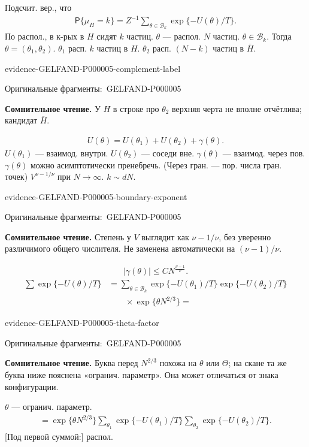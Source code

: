 \documentclass[11pt]{article}
\newcommand{\EvidenceBlock}[4]{%
 \par\smallskip\noindent\begin{minipage}{\linewidth}
 \begin{minipage}[t]{.47\linewidth}\vspace{0pt}\centering
 \csname evidence-#1-#2\endcsname\par
 {\scriptsize\SourceCropCaption\ #1}\par
 \end{minipage}\hfill
 \begin{minipage}[t]{.49\linewidth}\vspace{0pt}\raggedright
 {\small\color{orange!65!black}\textbf{#4} #3}\par
 \end{minipage}
 \end{minipage}\par\smallskip}
\newcommand{\Unclear}[3]{\EvidenceBlock{#1}{#2}{#3}{\ReadingCaption}}
\newcommand{\SourceCropCaption}{Оригинальные фрагменты:}\newcommand{\ReadingCaption}{Сомнительное чтение.}\newcommand{\IncompleteCaption}{Неразобранный фрагмент.}\newcommand{\DiagramCaption}{Рисунок и набранное описание.}
\begin{document}
Подсчит. вер., что
\begin{gather*}
 \mathsf{P}\{\mu_H=k\}=Z^{-1}
 \sum_{\theta\in\mathcal{B}_k}\exp\{-U(\theta)/T\}.
\end{gather*}
По распол., в к-рых в $H$ сидят $k$ частиц.
$\theta$ — распол. $N$ частиц.
$\theta\in\mathcal{B}_k$.
Тогда $\theta=(\theta_1,\theta_2)$.
$\theta_1$ расп. $k$ частиц в $H$.
$\theta_2$ расп. $(N-k)$ частиц в $\overline H$.
\Unclear{GELFAND-P000005}{complement-label}{У $H$ в строке про $\theta_2$ верхняя черта не вполне отчётлива; кандидат $\overline H$.}
\begin{gather*}
 U(\theta)=U(\theta_1)+U(\theta_2)+\gamma(\theta).
\end{gather*}
$U(\theta_1)$ — взаимод. внутри.
$U(\theta_2)$ — соседи вне.
$\gamma(\theta)$ — взаимод. через пов.
$\gamma(\theta)$ можно асимптотически пренебречь.
(Через гран. — пор. числа гран. точек)
$V^{\nu-1/\nu}$ при $N\to\infty$.
$k\sim dN$.
\Unclear{GELFAND-P000005}{boundary-exponent}{Степень у $V$ выглядит как $\nu-1/\nu$, без уверенно различимого общего числителя. Не заменена автоматически на $(\nu-1)/\nu$.}
\begin{gather*}
 |\gamma(\theta)|\le CN^{\frac{\nu-1}{\nu}}.
\end{gather*}
\begin{align*}
 \sum\exp\{-U(\theta)/T\}
 &=\sum_{\theta\in\mathcal{B}_k}\exp\{-U(\theta_1)/T\}
 \exp\{-U(\theta_2)/T\}\\
 &\qquad\times
 \exp\{\theta N^{2/3}\}
 =
\end{align*}
\Unclear{GELFAND-P000005}{theta-factor}{Буква перед $N^{2/3}$ похожа на $\theta$ или $\Theta$; на скане та же буква ниже пояснена «огранич. параметр». Она может отличаться от знака конфигурации.}
$\theta$ — огранич. параметр.
\begin{gather*}
 =\exp\{\theta N^{2/3}\}
 \sum_{\theta_1}\exp\{-U(\theta_1)/T\}
 \sum_{\theta_2}\exp\{-U(\theta_2)/T\}.
\end{gather*}
[Под первой суммой:] распол.
\end{document}
